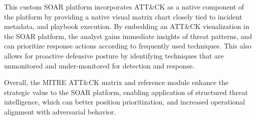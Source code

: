 This custom SOAR platform incorporates ATT\&CK as a native component of the platform by providing a native visual matrix chart closely tied to incident metadata, and playbook execution. By embedding an ATT\&CK visualization in the SOAR platform, the analyst gains immediate insights of threat patterns, and can prioritize response actions according to frequently used techniques. This also allows for proactive defensive posture by identifying techniques that are unmonitored and under-monitored for detection and response.

Overall, the MITRE ATT\&CK matrix and reference module enhance the strategic value to the SOAR platform, enabling application of structured threat intelligence, which can better position prioritization, and increased operational alignment with adversarial behavior.